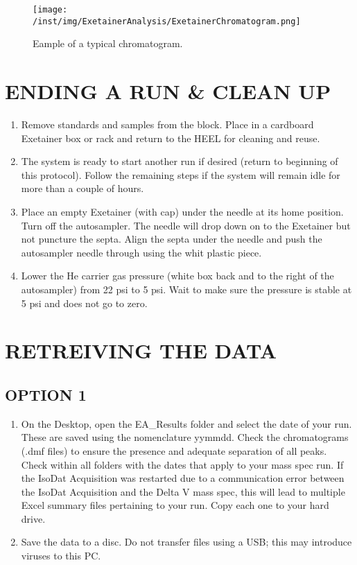 \documentclass[]{article}
\providecommand{\tightlist}{%
  \setlength{\itemsep}{0pt}\setlength{\parskip}{0pt}}
\begin{document}
\begin{figure}
\centering
\texttt{[image: /inst/img/ExetainerAnalysis/ExetainerChromatogram.png]}
\caption{Eample of a typical chromatogram.}
\end{figure}

\section{ENDING A RUN \& CLEAN UP}\label{ending-a-run-clean-up}

\begin{enumerate}
\def\labelenumi{\arabic{enumi}.}
\tightlist
\item
  Remove standards and samples from the block. Place in a cardboard
  Exetainer box or rack and return to the HEEL for cleaning and reuse.\\
\item
  The system is ready to start another run if desired (return to
  beginning of this protocol). Follow the remaining steps if the system
  will remain idle for more than a couple of hours.
\item
  Place an empty Exetainer (with cap) under the needle at its home
  position. Turn off the autosampler. The needle will drop down on to
  the Exetainer but not puncture the septa. Align the septa under the
  needle and push the autosampler needle through using the whit plastic
  piece.\\
\item
  Lower the He carrier gas pressure (white box back and to the right of
  the autosampler) from 22 psi to 5 psi. Wait to make sure the pressure
  is stable at 5 psi and does not go to zero.
\end{enumerate}

\section{RETREIVING THE DATA}\label{retreiving-the-data}

\subsection{OPTION 1}\label{option-1}

\begin{enumerate}
\def\labelenumi{\arabic{enumi}.}
\tightlist
\item
  On the Desktop, open the EA\_Results folder and select the date of
  your run. These are saved using the nomenclature yymmdd. Check the
  chromatograms (.dmf files) to ensure the presence and adequate
  separation of all peaks. Check within all folders with the dates that
  apply to your mass spec run. If the IsoDat Acquisition was restarted
  due to a communication error between the IsoDat Acquisition and the
  Delta V mass spec, this will lead to multiple Excel summary files
  pertaining to your run. Copy each one to your hard drive.
\item
  Save the data to a disc. Do not transfer files using a USB; this may
  introduce viruses to this PC.
\end{enumerate}
\end{document}
